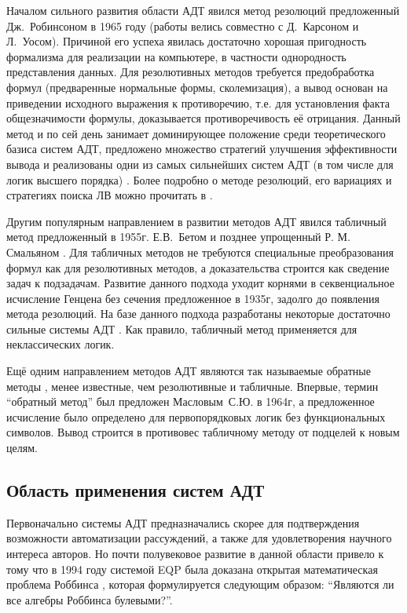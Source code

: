 Началом сильного развития области АДТ явился метод резолюций \cite{Robinson_1965} предложенный Дж.~Робинсоном в 1965 году (работы велись совместно с Д.~Карсоном и Л.~Уосом). Причиной его успеха явилась достаточно хорошая пригодность формализма для реализации на компьютере, в частности однородность представления данных. Для резолютивных методов требуется предобработка формул (предваренные нормальные формы, сколемизация), а вывод основан на приведении исходного выражения к противоречию, т.е. для установления факта общезначимости формулы, доказывается противоречивость её отрицания. Данный метод и по сей день занимает доминирующее положение среди теоретического базиса систем АДТ, предложено множество стратегий улучшения эффективности вывода и реализованы одни из самых сильнейших систем АДТ (в том числе для логик высшего порядка) \cite{otter, vprover, eprover, iprover, leoprover}. Более подробно о методе резолюций, его вариациях и стратегиях поиска ЛВ можно прочитать в \cite{HAR, ChenLi}.

Другим популярным направлением в развитии методов АДТ явился табличный метод \cite{tableau2} предложенный в 1955г. Е.В.~Бетом \cite{Beth1955} и позднее упрощенный Р. М. Смальяном \cite{Smullyan1995}. Для табличных методов не требуются специальные преобразования формул как для резолютивных методов, а доказательства строится как сведение задач к подзадачам.  Развитие данного подхода уходит корнями в секвенциальное исчисление Генцена без сечения \cite{gentzen1935} предложенное в 1935г, задолго до появления метода резолюций. На базе данного подхода разработаны некоторые достаточно сильные системы АДТ \cite{Isabelle, leancop}. Как правило, табличный метод применяется для неклассических логик.

Ещё одним направлением методов АДТ являются так называемые обратные методы \cite{inverse}, менее известные, чем резолютивные и табличные. Впервые, термин ``обратный метод'' был предложен Масловым~С.Ю. \cite{Maslov_1964} в 1964г, а предложенное исчисление было определено для первопорядковых логик без функциональных символов. Вывод строится в противовес табличному методу от подцелей к новым целям.


\subsection{Область применения систем АДТ}
Первоначально системы АДТ предназначались скорее для подтверждения возможности автоматизации рассуждений, а также для удовлетворения научного интереса авторов. Но почти полувековое развитие в данной области привело к тому что в 1994 году системой EQP была доказана открытая математическая проблема Роббинса \cite{McCuneRob}, которая формулируется следующим образом: ``Являются ли все алгебры Роббинса булевыми?''.

